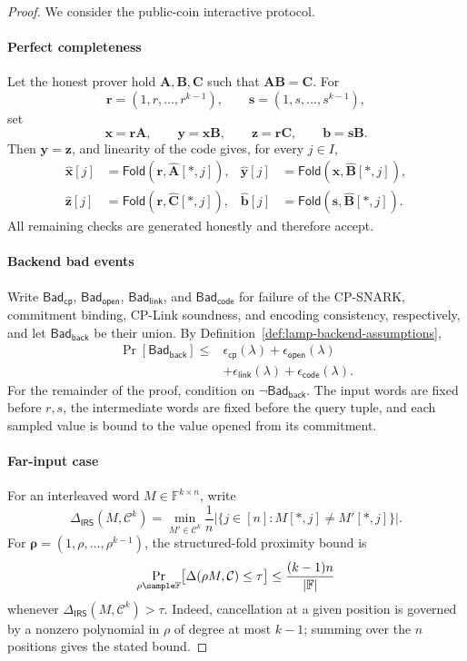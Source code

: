\documentclass[conference,compsoc]{IEEEtran}
\newif\ifshowrevisions
\newenvironment{revblock}[1][]
  {%
    \ifshowrevisions
      \begin{tcolorbox}[
        breakable,
        colback=revisionyellow,
        colframe=revisionyellow,
        boxrule=0pt,
        arc=0pt,
        left=2pt,
        right=2pt,
        top=2pt,
        bottom=2pt,
        before skip=2pt,
        after skip=2pt,
        #1
      ]
    \fi
  }
  {%
    \ifshowrevisions
      \end{tcolorbox}
    \fi
  }
\newcommand{\mat}{\mathbf}          %
\newcommand{\vect}{\mathbf}         %
\newcommand{\fold}{\textsf{Fold}}
\theoremstyle{plain}
\theoremstyle{definition}
\theoremstyle{remark}
\begin{document}
\begin{revblock}
\begin{proof}
We consider the public-coin interactive protocol.

\paragraph{Perfect completeness}
Let the honest prover hold \(\mat A,\mat B,\mat C\) such that
\(\mat A\mat B=\mat C\).  For
\[
  \vect r=(1,r,\ldots,r^{k-1}),\qquad
  \vect s=(1,s,\ldots,s^{k-1}),
\]
set
\[
  \vect x=\vect r\mat A,\qquad
  \vect y=\vect x\mat B,\qquad
  \vect z=\vect r\mat C,\qquad
  \vect b=\vect s\mat B.
\]
Then \(\vect y=\vect z\), and linearity of the code gives, for every
\(j\in I\),
\[
\begin{aligned}
 \widehat{\vect x}[j]&=\fold(\vect r,\widehat{\mat A}[*,j]),&
 \widehat{\vect y}[j]&=\fold(\vect x,\widehat{\mat B}[*,j]),\\
 \widehat{\vect z}[j]&=\fold(\vect r,\widehat{\mat C}[*,j]),&
 \widehat{\vect b}[j]&=\fold(\vect s,\widehat{\mat B}[*,j]).
\end{aligned}
\]
All remaining checks are generated honestly and therefore accept.

\paragraph{Backend bad events}
Write \(\mathsf{Bad}_{\mathsf{cp}}\),
\(\mathsf{Bad}_{\mathsf{open}}\), \(\mathsf{Bad}_{\mathsf{link}}\), and
\(\mathsf{Bad}_{\mathsf{code}}\) for failure of the CP-SNARK, commitment
binding, CP-Link soundness, and encoding consistency, respectively, and let
\(\mathsf{Bad}_{\mathsf{back}}\) be their union.  By
Definition~\ref{def:lamp-backend-assumptions},
\[
\begin{aligned}
\Pr[\mathsf{Bad}_{\mathsf{back}}]
\le{}&\epsilon_{\mathsf{cp}}(\lambda)
       +\epsilon_{\mathsf{open}}(\lambda)\\
     &+\epsilon_{\mathsf{link}}(\lambda)
       +\epsilon_{\mathsf{code}}(\lambda).
\end{aligned}
\]
For the remainder of the proof, condition on
\(\neg\mathsf{Bad}_{\mathsf{back}}\).  The input words are fixed before
\(r,s\), the intermediate words are fixed before the query tuple, and each
sampled value is bound to the value opened from its commitment.

\paragraph{Far-input case}
For an interleaved word \(M\in\mathbb F^{k\times n}\), write
\[
 \Delta_{\mathsf{IRS}}(M,\mathcal C^k)
 =\min_{M'\in\mathcal C^k}
   \frac{1}{n}|\{j\in[n]:M[*,j]\ne M'[*,j]\}|.
\]
For \(\vect\rho=(1,\rho,\ldots,\rho^{k-1})\), the structured-fold proximity
bound is
\[
 \Pr_{\rho\sample\mathbb F}
 \bigl[\Delta(\vect\rho M,\mathcal C)\le\tau\bigr]
 \le\frac{(k-1)n}{|\mathbb F|}
\]
whenever \(\Delta_{\mathsf{IRS}}(M,\mathcal C^k)>\tau\).  Indeed, cancellation
at a given position is governed by a nonzero polynomial in \(\rho\) of degree
at most \(k-1\); summing over the \(n\) positions gives the stated bound.


\end{proof}
\end{revblock}
\end{document}
